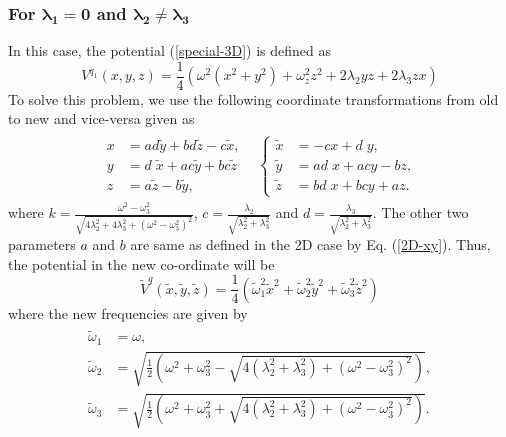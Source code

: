 \documentclass[a4paper, 12pt]{article}
\newcommand{\td}[1]{\tilde{#1}}
\begin{document}
\subsubsection{ For $\mathbf{\lambda_1=0}$ and $\mathbf{\lambda_2\ne \lambda_3}$}
In this case, the potential (\ref{special-3D}) is defined as
\begin{equation}
	V^{q_1}(x,y,z)=\frac{1}{4}\left(\omega^2(x^2+y^2)+\omega_z^2z^2+2\lambda_2 yz+2\lambda_3 zx\right)\label{vq}
\end{equation}
To solve this problem, we use the following coordinate transformations from old to new and vice-versa given as
\begin{align}\label{3D-xyz-IV}
  \begin{split}
  \begin{aligned}
      x &= a d \td{y} + bd\td{z} - c\td{x}, \\
      y &= d\; \td{x} + ac\td{y} + bc\td{z} \\
      z &=a\td{z} - b\td{y}, 
  \end{aligned}
  & 
  \left\{
  \begin{aligned}
    \td{x} &= - cx + d\;y  , \\
    \td{y} &=ad\;x + acy - bz, \\
    \td{z} &= bd\;x + bcy + az.
  \end{aligned}
  \right.
  \end{split}
\end{align}
where \(k = \frac{\omega^2 - \omega_3^2}{\sqrt{4 \lambda_2^2 + 4 \lambda_3^2 + \left(\omega^2 - \omega_3^2\right)^2}}\), $c=\frac{\lambda_2}{\sqrt{\lambda_2^2+\lambda_3^2}}$ and $d=\frac{\lambda_3}{\sqrt{\lambda_2^2+\lambda_3^2}}$. The other two parameters $a$ and $b$ are same as defined in the 2D case by Eq. (\ref{2D-xy}). Thus, the potential in the new co-ordinate will be
\begin{equation}
\tilde{V}^{q}(\td{x},\td{y},\td{z})=\frac{1}{4}\left(\td{\omega}_1^2\td{x}^2+\td{\omega}_2^2 \td{y}^2+\td{\omega}_3^2\td{z}^2\right)	\label{V_q}
\end{equation}
where the new frequencies are given by
\begin{align}\label{3D-omega'-IV}
  \begin{split}
    \td{\omega}_1 &= \omega, \\
    \td{\omega}_2 &= \sqrt{\frac{1}{2}\left(\omega^2+\omega_3^2 - \sqrt{4(\lambda_2^2 + \lambda_3^2) + \left(\omega^2-\omega_3^2\right)^2}\right)}, \\
    \td{\omega}_3 &= \sqrt{\frac{1}{2}\left(\omega^2+\omega_3^2 + \sqrt{4(\lambda_2^2 + \lambda_3^2) + \left(\omega^2-\omega_3^2\right)^2}\right)}.
  \end{split}
\end{align}
\end{document}
